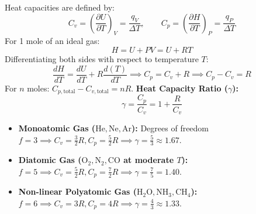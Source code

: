 \documentclass[10pt,twoside,openright]{book}
\begin{document}
\begin{formulabox}[Derivation of Mayer's Relation: $C_p - C_v = R$]
Heat capacities are defined by:
\begin{equation}
  C_v = \left(\frac{\partial U}{\partial T}\right)_V = \frac{q_V}{\Delta T}, \qquad C_p = \left(\frac{\partial H}{\partial T}\right)_P = \frac{q_P}{\Delta T}
\end{equation}
For 1 mole of an ideal gas:
\begin{equation}
  H = U + P V = U + R T
\end{equation}
Differentiating both sides with respect to temperature $T$:
\begin{equation}
  \frac{dH}{dT} = \frac{dU}{dT} + R \frac{d(T)}{dT} \implies C_p = C_v + R \implies C_p - C_v = R
\end{equation}
For $n$ moles: $C_{p,\text{total}} - C_{v,\text{total}} = n R$.
\textbf{Heat Capacity Ratio ($\gamma$):}
\begin{equation}
  \gamma = \frac{C_p}{C_v} = 1 + \frac{R}{C_v}
\end{equation}
\begin{itemize}
  \item \textbf{Monoatomic Gas ($\mathrm{He, Ne, Ar}$):} Degrees of freedom $f = 3 \implies C_v = \frac{3}{2}R, C_p = \frac{5}{2}R \implies \gamma = \frac{5}{3} \approx 1.67$.
  \item \textbf{Diatomic Gas ($\mathrm{O_2, N_2, CO}$ at moderate $T$):} $f = 5 \implies C_v = \frac{5}{2}R, C_p = \frac{7}{2}R \implies \gamma = \frac{7}{5} = 1.40$.
  \item \textbf{Non-linear Polyatomic Gas ($\mathrm{H_2O, NH_3, CH_4}$):} $f = 6 \implies C_v = 3R, C_p = 4R \implies \gamma = \frac{4}{3} \approx 1.33$.
\end{itemize}
\end{formulabox}
\end{document}
